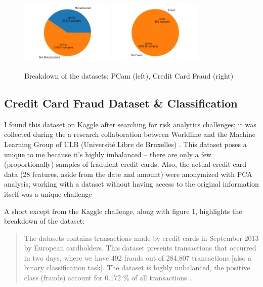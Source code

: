 \documentclass[a4paper]{article}
\begin{document}
\begin{figure}
  \centering
  \includegraphics[width=0.4\textwidth]{images/pcamDistr.png}
  \includegraphics[width=0.4\textwidth]{images/fraudImg.png}
  \caption{Breakdown of the datasets; PCam (left), Credit Card Fraud (right)}
\end{figure}

\subsection{Credit Card Fraud Dataset \& Classification}

I found this dataset on Kaggle after searching for risk analytics challenges; it was collected during the a research collaboration between Worldline and the Machine Learning Group of ULB (Université Libre de Bruxelles) \autocite{dal2015calibrating}. This dataset poses a unique to me because it's highly imbalanced -- there are only a few (proportionally) samples of fradulent credit cards. Also, the actual credit card data (28 features, aside from the date and amount) were anonymized with PCA analysis; working with a dataset without having access to the original information itself was a unique challenge

A short except from the Kaggle challenge, along with figure 1, highlights the breakdown of the dataset:

\begin{quote}
The datasets contains transactions made by credit cards in September 2013 by European cardholders. This dataset presents transactions that occurred in two days, where we have 492 frauds out of 284,807 transactions [also a binary classification task]. The dataset is highly unbalanced, the positive class (frauds) account for 0.172 \% of all transactions \autocite{Kaggle-CreditCard}.
\end{quote}
\end{document}
